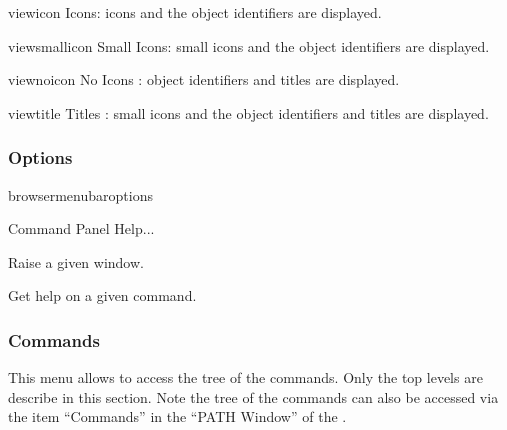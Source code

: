 \begin{PAWf}[.6]{viewicon}
Icons: icons and the object identifiers are displayed.
\end{PAWf}

\begin{PAWf}[.6]{viewsmallicon}
Small Icons: small icons  and the object identifiers are displayed.
\end{PAWf}

\begin{PAWf}[.6]{viewnoicon}
No Icons : object identifiers and titles are displayed.
\end{PAWf}

\begin{PAWf}[.6]{viewtitle}
Titles : small icons  and the object identifiers and titles are displayed.
\end{PAWf}

\subsubsection{Options}

\begin{PAWf}{browsermenubaroptions}
\begin{DLsf}{Command Panel Help...}
\item[Raise Window]                    Raise a given window.
\item[Command Argument Panel...]       Get help on a given command.
\end{DLsf}
\end{PAWf}

\subsubsection{Commands}

This menu allows to access the tree of the \XPAW{} commands. Only the
top levels are describe in this section. Note the tree of the \XPAW{}
commands can also be accessed via the item ``Commands'' in the ``PATH Window''
of the \MB.

